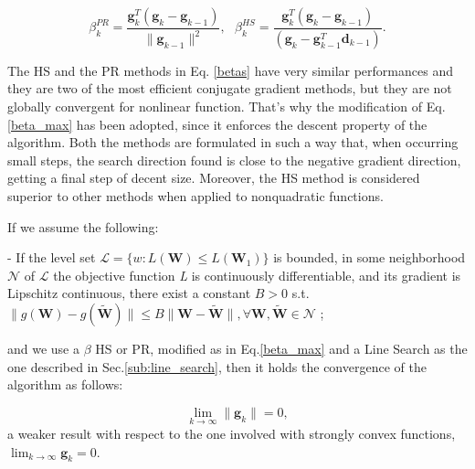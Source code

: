 			\begin{equation}
			\label{betas}
				 \beta^{PR}_k = \frac{\textbf{g}_k^T(\textbf{g}_k-\textbf{g}_{k-1})}{\|\textbf{g}_{k-1}\|^2}, \text{ }
 				 \beta^{HS}_k = \frac{\textbf{g}_k^T(\textbf{g}_k-\textbf{g}_{k-1})}{(\textbf{g}_k-\textbf{g}_{k-1}^T\textbf{d}_{k-1})}.
			\end{equation}

			The HS and the PR methods in Eq. \ref{betas} have very similar performances and they are two of the most efficient conjugate gradient methods, but they are not globally convergent for nonlinear function\cite{Griffiths-1984}. That's why the modification of Eq. \ref{beta_max} has been adopted\cite{Powell-1986}, since it enforces the descent property of the algorithm. 
			Both the methods are formulated in such a way that, when occurring small steps, the search direction found is close to the negative gradient direction, getting a final step of decent size\cite{Gilbert-1992}.
			Moreover, the HS method is considered superior to other methods when applied to nonquadratic functions.

			If we assume the following:

			\begin{asu} - \label{as:cg_conv}
  				If the level set $\mathcal{L} = \{w : \textit{L}(\textbf{W}) \leq L(\textbf{W}_1)\}$ is bounded, in some neighborhood $\mathcal{N}$ of $\mathcal{L}$ the objective function \textit{L} is continuously differentiable, and its gradient is Lipschitz continuous, there exist a constant $B > 0$ s.t. $\|g(\textbf{W})-g(\widetilde{\textbf{W}})\| \leq B\|\textbf{W}-\widetilde{\textbf{W}}\| , \forall \textbf{W},\widetilde{\textbf{W}} \in \mathcal{N}$ ;
			\end{asu}

			and we use a $\beta$ HS or PR, modified as in Eq.\ref{beta_max} and a Line Search as the one described in Sec.\ref{sub:line_search}, then it holds the convergence of the algorithm as follows\cite{Gilbert-1992}:

			\begin{equation}
			\label{conv_cg}
			  \lim_{k \to \infty} \|\textbf{g}_k\| = 0,
			\end{equation}
			a weaker result with respect to the one involved with strongly convex functions, $\lim_{k \to \infty} \textbf{g}_k = 0.$


